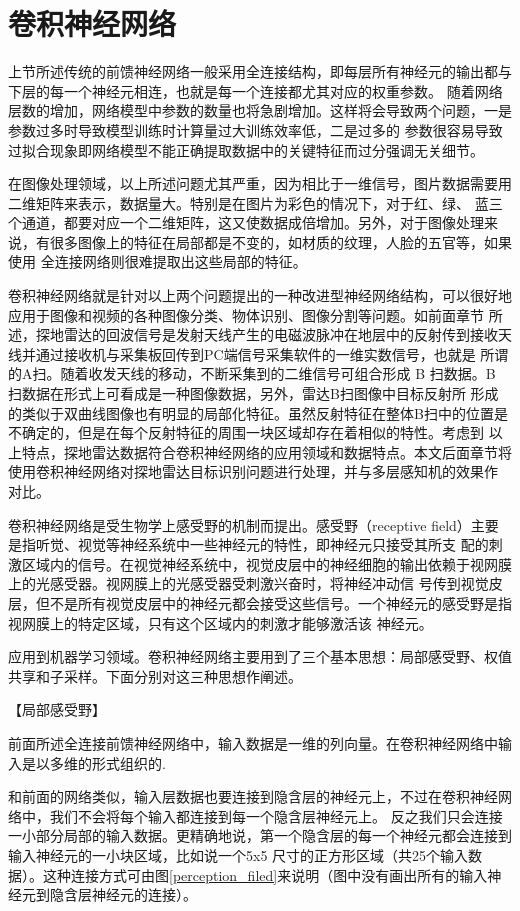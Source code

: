 \section{卷积神经网络}
上节所述传统的前馈神经网络一般采用全连接结构，即每层所有神经元的输出都与下层的每一个神经元相连，也就是每一个连接都尤其对应的权重参数。
随着网络层数的增加，网络模型中参数的数量也将急剧增加。这样将会导致两个问题，一是参数过多时导致模型训练时计算量过大训练效率低，二是过多的
参数很容易导致过拟合现象即网络模型不能正确提取数据中的关键特征而过分强调无关细节。

在图像处理领域，以上所述问题尤其严重，因为相比于一维信号，图片数据需要用二维矩阵来表示，数据量大。特别是在图片为彩色的情况下，对于红、绿、
蓝三个通道，都要对应一个二维矩阵，这又使数据成倍增加。另外，对于图像处理来说，有很多图像上的特征在局部都是不变的，如材质的纹理，人脸的五官等，如果使用
全连接网络则很难提取出这些局部的特征。

卷积神经网络就是针对以上两个问题提出的一种改进型神经网络结构，可以很好地应用于图像和视频的各种图像分类、物体识别、图像分割等问题。如前面章节
所述，探地雷达的回波信号是发射天线产生的电磁波脉冲在地层中的反射传到接收天线并通过接收机与采集板回传到PC端信号采集软件的一维实数信号，也就是
所谓的A扫。随着收发天线的移动，不断采集到的二维信号可组合形成 B 扫数据。B 扫数据在形式上可看成是一种图像数据，另外，雷达B扫图像中目标反射所
形成的类似于双曲线图像也有明显的局部化特征。虽然反射特征在整体B扫中的位置是不确定的，但是在每个反射特征的周围一块区域却存在着相似的特性。考虑到
以上特点，探地雷达数据符合卷积神经网络的应用领域和数据特点。本文后面章节将使用卷积神经网络对探地雷达目标识别问题进行处理，并与多层感知机的效果作
对比。

卷积神经网络是受生物学上感受野的机制而提出。感受野（receptive field）主要是指听觉、视觉等神经系统中一些神经元的特性，即神经元只接受其所支
配的刺激区域内的信号。在视觉神经系统中，视觉皮层中的神经细胞的输出依赖于视网膜上的光感受器。视网膜上的光感受器受刺激兴奋时，将神经冲动信
号传到视觉皮层，但不是所有视觉皮层中的神经元都会接受这些信号。一个神经元的感受野是指视网膜上的特定区域，只有这个区域内的刺激才能够激活该
神经元。

应用到机器学习领域。卷积神经网络主要用到了三个基本思想：局部感受野、权值共享和子采样。下面分别对这三种思想作阐述。

【局部感受野】

前面所述全连接前馈神经网络中，输入数据是一维的列向量。在卷积神经网络中输入是以多维的形式组织的.

和前面的网络类似，输入层数据也要连接到隐含层的神经元上，不过在卷积神经网络中，我们不会将每个输入都连接到每一个隐含层神经元上。
反之我们只会连接一小部分局部的输入数据。更精确地说，第一个隐含层的每一个神经元都会连接到输入神经元的一小块区域，比如说一个5x5
尺寸的正方形区域（共25个输入数据）。这种连接方式可由图\ref{perception_filed}来说明（图中没有画出所有的输入神经元到隐含层神经元的连接）。

